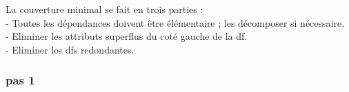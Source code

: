 \documentclass[a4paper,sffamily,12pt]{article}
\begin{document}
			\vspace{0.5cm}

			\noindent La couverture minimal se fait en trois parties : \\
				- Toutes les dépendances doivent être élémentaire ; les décomposer si nécessaire. \\
				- Eliminer les attributs superflus du coté gauche de la df. \\
				- Eliminer les dfs redondantes.
			
			\vspace{0.5cm}
				
			\subsubsection{pas 1}

				\vspace{0.5cm}
\end{document}

